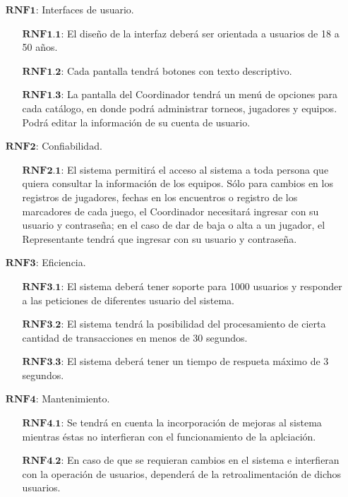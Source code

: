 \begin{enumerate}
	\item[$\textbf{RNF1:}$] Interfaces de usuario.
		\begin{enumerate}
			\item[$\textbf{RNF1.1:}$] El diseño de la interfaz deberá ser orientada a usuarios de 18 a 50 años.
			\item[$\textbf{RNF1.2:}$] Cada pantalla tendrá botones con texto descriptivo.
			\item[$\textbf{RNF1.3:}$] La pantalla del Coordinador tendrá un menú de opciones para cada catálogo, en donde podrá administrar torneos, jugadores y equipos. Podrá editar la información de su cuenta de usuario.
		\end{enumerate}
	\item[$\textbf{RNF2:}$] Confiabilidad.
		\begin{enumerate}
			\item[$\textbf{RNF2.1:}$] El sistema permitirá el acceso al sistema a toda persona que quiera consultar la información de los equipos. Sólo para cambios en los registros de jugadores, fechas en los encuentros o registro de los marcadores de cada juego, el Coordinador necesitará ingresar con su usuario y contraseña; en el caso de dar de baja o alta a un jugador, el Representante tendrá que ingresar con su usuario y contraseña.
		\end{enumerate}
	\item[$\textbf{RNF3:}$] Eficiencia.
		\begin{enumerate}
			\item[$\textbf{RNF3.1:}$] El sistema deberá tener soporte para 1000 usuarios y responder a las peticiones de diferentes usuario del sistema.
			\item[$\textbf{RNF3.2:}$] El sistema tendrá la posibilidad del procesamiento de cierta cantidad de transacciones en menos de 30 segundos.
			\item[$\textbf{RNF3.3:}$] El sistema deberá tener un tiempo de respueta máximo de 3 segundos.
		\end{enumerate}
	\item[$\textbf{RNF4:}$] Mantenimiento.
		\begin{enumerate}
			\item[$\textbf{RNF4.1:}$] Se tendrá en cuenta la incorporación de mejoras al sistema mientras éstas no interfieran con el funcionamiento de la aplciación.
			\item[$\textbf{RNF4.2:}$] En caso de que se requieran cambios en el sistema e interfieran con la operación de usuarios, dependerá de la retroalimentación de dichos usuarios.

\end{enumerate}
\end{enumerate}

